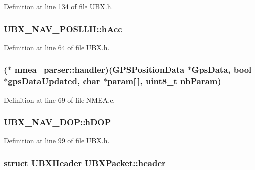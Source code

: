 Definition at line 134 of file U\-B\-X.\-h.

\hypertarget{group___g_s_p_module_gaf3b4eaeb1feedb8295a519b23a76bf83}{
\subsubsection[{h\-Acc}]{ U\-B\-X\-\_\-\-N\-A\-V\-\_\-\-P\-O\-S\-L\-L\-H\-::h\-Acc}}\label{group___g_s_p_module_gaf3b4eaeb1feedb8295a519b23a76bf83}


Definition at line 64 of file U\-B\-X.\-h.

\hypertarget{group___g_s_p_module_ga3fd709a52dda42524d0394f5d226daff}{
\subsubsection[{handler}]{($\ast$ nmea\-\_\-parser\-::handler)(G\-P\-S\-Position\-Data $\ast$Gps\-Data, {\bf bool} $\ast$gps\-Data\-Updated, char $\ast$param\mbox{[}$\,$\mbox{]}, {\bf uint8\-\_\-t} nb\-Param)}}\label{group___g_s_p_module_ga3fd709a52dda42524d0394f5d226daff}


Definition at line 69 of file N\-M\-E\-A.\-c.

\hypertarget{group___g_s_p_module_ga04de37f3f6aaf991ce6435808faed53b}{
\subsubsection[{h\-D\-O\-P}]{ U\-B\-X\-\_\-\-N\-A\-V\-\_\-\-D\-O\-P\-::h\-D\-O\-P}}\label{group___g_s_p_module_ga04de37f3f6aaf991ce6435808faed53b}


Definition at line 99 of file U\-B\-X.\-h.

\hypertarget{group___g_s_p_module_gaa1e79029fc57ab8ba520dfaf0c66f660}{
\subsubsection[{header}]{\setlength{\rightskip}{0pt plus 5cm}struct {\bf U\-B\-X\-Header} U\-B\-X\-Packet\-::header}}\label{group___g_s_p_module_gaa1e79029fc57ab8ba520dfaf0c66f660}


